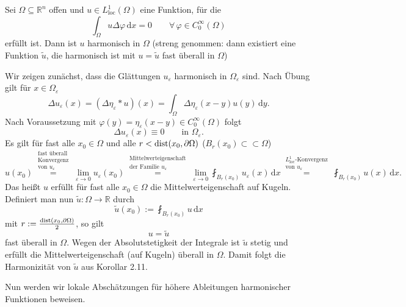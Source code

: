 \begin{satz}
	Sei $\Omega \subseteq \mathbb{R}^n$ offen und $u \in L^1_{\text{loc}}(\Omega)$ eine Funktion, für die 
	\begin{equation}
		\int_{\Omega}^{} u \Delta \varphi \,\mathrm{d}x = 0 \qquad \forall\, \varphi \in C^{\infty}_0(\Omega)
	\end{equation}
	erfüllt ist. 
	Dann ist $u$ harmonisch in $\Omega$ (streng genommen: dann existiert eine Funktion $\tilde u$, die harmonisch ist mit $u = \tilde u$ fast überall in $\Omega$)
\end{satz}

\begin{beweis}
	Wir zeigen zunächst, dass die Glättungen $u_{\varepsilon}$ harmonisch in $\Omega_{\varepsilon}$ sind. Nach Übung gilt für $x \in \Omega_{\varepsilon}$
	\[
		\Delta u_{\varepsilon}(x) = ( \Delta \eta_{\varepsilon} * u)(x) = \int_{\Omega}^{} \Delta \eta_{\varepsilon}(x-y)u(y) \,\mathrm{d}y.
	\]
	Nach Voraussetzung mit $\varphi(y)= \eta_{\varepsilon}(x-y) \in C^{\infty}_0(\Omega)$ folgt 
	\[
		\Delta u_{\varepsilon}(x) \equiv 0 \qquad \text{in }\Omega_{\varepsilon}.
	\]
	Es gilt für fast alle $x_0 \in \Omega$ und alle $r < \operatorname{dist}(x_0, \partial \Omega)$ ($B_r(x_0) \subset \subset \Omega$) 
	\begin{equation}
		u(x_0) \stackrel{\substack{\text{fast überall}\\\text{Konvergenz}\\\text{von }u_{\varepsilon}}}{=}
		\lim_{\varepsilon \to 0} u_{\varepsilon}(x_0) 
		\stackrel{\substack{\text{Mittelwerteigenschaft} \\\text{der Familie }u_{\varepsilon}}}{=} \lim_{\varepsilon \to 0} 
		\fint_{B_r(x_0)}^{}u_{\varepsilon}(x) \,\mathrm{d}x 
		\stackrel{\substack{L^1_{\text{loc}}\text{-Konvergenz}\\ \text{von }u_{\varepsilon}}}{=}
		\fint_{B_r(x_0)}^{} u(x) \,\mathrm{d}x.
	\end{equation}
	Das heißt $u$ erfüllt für fast alle $x_0 \in \Omega$ die Mittelwerteigenschaft auf Kugeln. 
	Definiert man nun $\tilde u: \Omega \to \mathbb{R}$ durch
	\[
		\tilde u(x_0):= \fint_{B_r(x_0)}^{}u \,\mathrm{d}x
	\]
	mit $r:= \frac{\operatorname{dist}(x_0, \partial \Omega)}{2}$, so gilt 
	\begin{equation}
		u = \tilde u
	\end{equation}
	fast überall in $\Omega$. Wegen der Absolutstetigkeit der Integrale ist $\tilde u$ stetig und erfüllt die Mittelwerteigenschaft (auf Kugeln) überall in $\Omega$.
	Damit folgt die Harmonizität von $\tilde u$ aus Korollar 2.11.
\end{beweis}
Nun werden wir lokale Abschätzungen für höhere Ableitungen harmonischer Funktionen beweisen.

